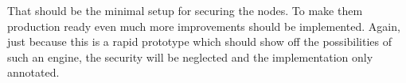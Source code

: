 \newpage %

That should be the minimal setup for securing the nodes.
To make them production ready even much more improvements should be implemented.
Again, just because this is a rapid prototype which should show off the possibilities of such an engine, the security will be neglected and the implementation only annotated.
